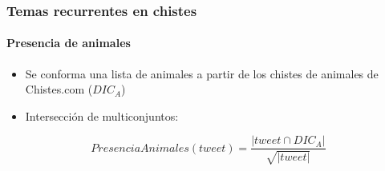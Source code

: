 \begin{frame}
    \frametitle{Temas recurrentes en chistes}
    \framesubtitle{Presencia de animales}

    \begin{itemize}
        \item Se conforma una lista de animales a partir de los chistes de animales de Chistes.com ($DIC_A$)
        \item Intersección de multiconjuntos:
    \end{itemize}

    \begin{center}
        \[
            PresenciaAnimales(tweet) = \frac{|tweet \cap DIC_A|}{\sqrt{|tweet|}}
        \]
    \end{center}
\end{frame}

